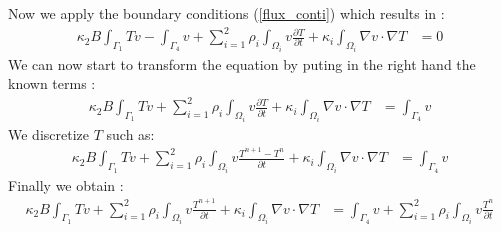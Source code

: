 Now we apply the boundary conditions (\ref{flux_conti}) which results in :
\begin{equation}
   \begin{split}
 \displaystyle{ \kappa_2 B \int_{\Gamma_1}{T v} - \int_{\Gamma_4} {v}  + \sum_{i=1}^{2} \rho_i \int_{\varOmega_i} v\frac{ \partial T}{\partial t} + \kappa_i \int_{\varOmega_i} {\nabla v \cdot \nabla T} } & =   0 
  \end{split}
\end{equation}
We can now start to transform the equation by puting in the right hand the known terms :
\begin{equation}
   \begin{split}
 \displaystyle{\kappa_2 B \int_{\Gamma_1}{T v}  + \sum_{i=1}^{2} \rho_i \int_{\varOmega_i} v\frac{ \partial T}{\partial t} + \kappa_i \int_{\varOmega_i} {\nabla v \cdot \nabla T} } & =  
 \int_{\Gamma_4} {v}	 
  \end{split}
\end{equation}
We discretize $T$ such as:
\begin{equation}
   \begin{split}
 \displaystyle{ \kappa_2 B \int_{\Gamma_1}{T v} + \sum_{i=1}^{2} \rho_i \int_{\varOmega_i} v\frac{T^{n+1} - T^n}{\partial t} + \kappa_i \int_{\varOmega_i} {\nabla v \cdot \nabla T} } & =  
 \int_{\Gamma_4} {v}	 
  \end{split}
\end{equation}
Finally we obtain :
\begin{equation}
   \begin{split}
 \displaystyle{ \kappa_2 B \int_{\Gamma_1}{T v} + \sum_{i=1}^{2} \rho_i \int_{\varOmega_i} v\frac{T^{n+1}}{\partial t} + \kappa_i \int_{\varOmega_i} {\nabla v \cdot \nabla T}} & =  
	\displaystyle{ \int_{\Gamma_4} {v}	+  \sum_{i=1}^{2}  \rho_i \int_{\varOmega_i} v \frac{T^n}{\partial t}  }
  \end{split}
\end{equation}

